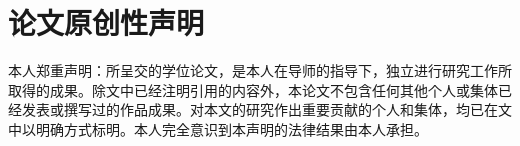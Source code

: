 {\begin{titlepage}
\begin{center}
 \begin{spacing}{2.0}
 \vspace*{42pt}
  \setlength{\@title@width}{5cm}
  {\sanhao{}
 }
 \end{spacing}
 \vspace*{32pt}

\song{}
\end{center}
\end{titlepage}

\newpage
\thispagestyle{empty}
\mbox{}


\clearpage
{}
\chapter*{\centering\sanhao\song\bfseries 论文原创性声明}
\song{}
本人郑重声明：所呈交的学位论文，是本人在导师的指导下，独立进行研究工作所取得的成果。除文中已经注明引用的内容外，本论文不包含任何其他个人或集体已经发表或撰写过的作品成果。对本文的研究作出重要贡献的个人和集体，均已在文中以明确方式标明。本人完全意识到本声明的法律结果由本人承担。

\vspace*{40pt}
\begin{flushright}
\setlength{\@title@width}{5cm}
  {\sihao{}
 }
\end{flushright}

}
